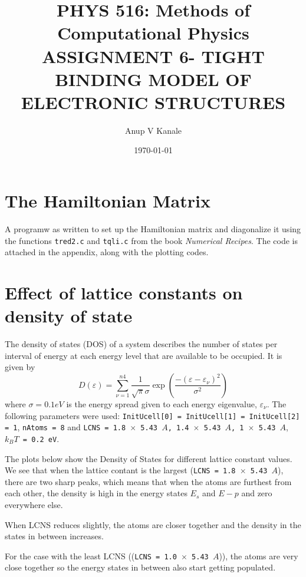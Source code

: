\documentclass[11pt, oneside]{article}   	%
\title{\vspace{-6ex}\large PHYS 516: Methods of Computational Physics \\ [1ex]
 ASSIGNMENT 6- TIGHT BINDING MODEL OF ELECTRONIC STRUCTURES\vspace{-3ex}}
\author{Anup V Kanale}
\date{\vspace{-3ex}\today}							%
\begin{document}
\vspace{-6ex}\maketitle

\section{The Hamiltonian Matrix}
A programw as written to set up the Hamiltonian matrix and diagonalize it using the functions \texttt{tred2.c} and \texttt{tqli.c} from the book \textit{Numerical Recipes}. The code is attached in the appendix, along with the plotting codes.

\section{Effect of lattice constants on density of state}
 The density of states (DOS) of a system describes the number of states per interval of energy at each energy level that are available to be occupied. It is given by 
 	\begin{equation}
 	D(\varepsilon) = \sum \limits_{\nu=1}^{n4} \frac{1}{\sqrt{\pi}\sigma} \exp (\frac{-(\varepsilon - \varepsilon_\nu)^2}{\sigma^2})
 	\end{equation}
 where $\sigma = 0.1 eV$ is the energy spread given to each energy eigenvalue, $\varepsilon_\nu$. The following parameters were used: \texttt{InitUcell[0] = InitUcell[1] = InitUcell[2] = 1}, \texttt{nAtoms = 8} and \texttt{LCNS = 1.8 $\times$ 5.43 $A$, 1.4 $\times$ 5.43 $A$, 1 $\times$ 5.43 $A$}, \texttt{$k_BT$ = 0.2 eV}.
 
 The plots below show the Density of States for different lattice constant values. We see that when the lattice contant is the largest (\texttt{LCNS = 1.8 $\times$ 5.43 $A$}), there are two sharp peaks, which means that when the atoms are furthest from each other, the density is high in the energy states $E_s$ and $E-p$ and zero everywhere else.
 
 When LCNS reduces slightly, the atoms are closer together and the density in the states in between increases.
 
 For the case with the least LCNS ((\texttt{LCNS = 1.0 $\times$ 5.43 $A$})), the atoms are very close together so the energy states in between also start getting populated.
\end{document}
